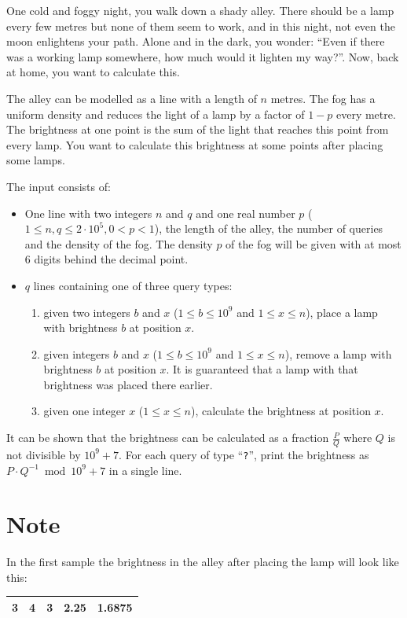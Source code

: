 
%
One cold and foggy night, you walk down a shady alley.
There should be a lamp every few metres but none of them seem to work, and in this night, not even the moon enlightens your path.
Alone and in the dark, you wonder:
``Even if there was a working lamp somewhere, how much would it lighten my way?''.
Now, back at home, you want to calculate this.

The alley can be modelled as a line with a length of $n$ metres.
The fog has a uniform density and reduces the light of a lamp by a factor of $1-p$ every metre.
The brightness at one point is the sum of the light that reaches this point from every lamp.
You want to calculate this brightness at some points after placing some lamps.

\begin{Input}
	The input consists of:
	\begin{itemize}
		\item One line with two integers $n$ and $q$ and one real number $p$  ($1\leq n, q\leq 2\cdot10^5, 0 < p < 1$),
		the length of the alley, the number of queries and the density of the fog.
		The density $p$ of the fog will be given with at most $6$ digits behind the decimal point.
		\item $q$ lines containing one of three query types:
		\begin{enumerate}
			\item[``\textbf{\texttt{+ b x}}''] given two integers $b$ and $x$ ($1\leq b \leq 10^9$ and $1\leq x \leq n$), place a lamp with brightness $b$ at position $x$.
			\item[``\textbf{\texttt{- b x}}''] given integers $b$ and $x$ ($1\leq b \leq 10^9$ and $1\leq x \leq n$), remove a lamp with brightness $b$ at position $x$.
			It is guaranteed that a lamp with that brightness was placed there earlier. 
			\item[``\textbf{\texttt{?~x}}''] given one integer $x$ ($1\leq x \leq n$), calculate the brightness at position $x$.
		\end{enumerate}
	\end{itemize}
\end{Input}
\begin{Output}
	It can be shown that the brightness can be calculated as a fraction $\frac{P}{Q}$ where $Q$ is not divisible by $10^9+7$.
	For each query of type ``\texttt{?}'', print the brightness as $P\cdot Q^{-1} \bmod 10^9+7$ in a single line.
\end{Output}

\section*{Note}
In the first sample the brightness in the alley after placing the lamp will look like this:

\begin{tabular}{|c|c|c|c|c|}
	\hline
	3 & 4 & 3 & 2.25 & 1.6875 \\
	\hline
\end{tabular}
